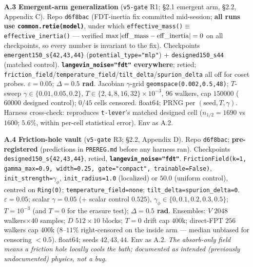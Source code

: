 \documentclass{article}
\begin{document}
\textbf{A.3 Emergent-arm generalization} (\texttt{v5-gate} R1; \S 2.1 emergent arm, \S 2.2, Appendix C). Repo \texttt{d6f8bac} (FDT-inertia fix committed mid-session; \textbf{all runs use \texttt{common.retie(model)}}, under which \texttt{effective\_mass()}$\equiv$\texttt{effective\_inertia()} --- verified $\max|{\rm eff\_mass}-{\rm eff\_inertia}|=0$ on all checkpoints, so every number is invariant to the fix). Checkpoints \texttt{emergent150\_s\{42,43,44\}} (\texttt{potential\_type="mlp"}) + \texttt{designed150\_s44} (matched control). \textbf{\texttt{langevin\_noise="fdt"} everywhere}; retied; \texttt{friction\_field}/\texttt{temperature\_field}/\texttt{tilt\_delta}/\texttt{spurion\_delta} all off for coset probes. $\varepsilon=0.05$; \textbf{$\Delta=0.5$ rad}. Jacobian $\gamma$-grid \texttt{geomspace(0.002,0.5,48)}; $T$-sweep $\gamma\in\{0.01,0.05,0.2\}$, $T\in\{2,4,8,16,32\}\times10^{-3}$, $96$ walkers, cap $150000$ ($60000$ designed control); $0/45$ cells censored. float64; PRNG per $(\text{seed},T,\gamma)$. Harness cross-check: reproduces \texttt{t-lever}'s matched designed cell ($n_{1/2}=1690$ vs $1600$; $5.6\%$, within per-cell statistical error). Env as A.2.

\textbf{A.4 Friction-hole vault} (\texttt{v5-gate} R3; \S 2.2, Appendix D). Repo \texttt{d6f8bac}; \textbf{pre-registered} (predictions in \texttt{PREREG.md} before any harness ran). Checkpoints \texttt{designed150\_s\{42,43,44\}}, retied, \textbf{\texttt{langevin\_noise="fdt"}}. \texttt{FrictionField(k=1, gamma\_max=0.9, width=0.25, gate="compact", trainable=False)}, \texttt{init\_strength=}$\gamma_\phi$, \texttt{init\_radius=1.0} (localized) or $50.0$ (uniform control), centred on \texttt{Ring(0)}; \texttt{temperature\_field=none}; \texttt{tilt\_delta=spurion\_delta=0}. $\varepsilon=0.05$; scalar $\gamma=0.05$ (+ scalar control $0.525$), $\gamma_\phi\in\{0,0.1,0.2,0.3,0.5\}$; $T=10^{-3}$ (and $T=0$ for the erasure test); \textbf{$\Delta=0.5$ rad}. Ensembles: $V$ $2048$ walkers$\times40$ samples; $D$ $512\times10$ blocks; $T=0$ drift cap $400$k; direct-FPT $256$ walkers cap $400$k ($8$--$11\%$ right-censored on the inside arm --- median unbiased for censoring $<0.5$). float64; seeds $42,43,44$. Env as A.2. \emph{The absorb-only field means a friction hole locally cools the bath; documented as intended (previously undocumented) physics, not a bug.}
\end{document}
